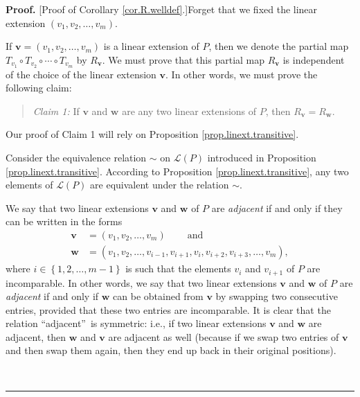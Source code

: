 \documentclass[numbers=enddot,12pt,final,onecolumn,notitlepage]{scrartcl}%
\theoremstyle{definition}
\newenvironment{verlong}{}{}
\newenvironment{statement}{\begin{quote}}{\end{quote}}
\newenvironment{proof}[1][Proof]{\noindent\textbf{#1.} }{\ \rule{0.5em}{0.5em}}
\begin{document}
\begin{verlong}


\begin{proof}
[Proof of Corollary \ref{cor.R.welldef}.]Forget that we fixed the linear
extension $\left(  v_{1},v_{2},\ldots,v_{m}\right)  $.

If $\mathbf{v}=\left(  v_{1},v_{2},\ldots,v_{m}\right)  $ is a linear
extension of $P$, then we denote the partial map $T_{v_{1}}\circ T_{v_{2}%
}\circ\cdots\circ T_{v_{m}}$ by $R_{\mathbf{v}}$. We must prove that this
partial map $R_{\mathbf{v}}$ is independent of the choice of the linear
extension $\mathbf{v}$. In other words, we must prove the following claim:

\begin{statement}
\textit{Claim 1:} If $\mathbf{v}$ and $\mathbf{w}$ are any two linear
extensions of $P$, then $R_{\mathbf{v}}=R_{\mathbf{w}}$.
\end{statement}

Our proof of Claim 1 will rely on Proposition \ref{prop.linext.transitive}.

Consider the equivalence relation $\sim$ on $\mathcal{L}\left(  P\right)  $
introduced in Proposition \ref{prop.linext.transitive}. According to
Proposition \ref{prop.linext.transitive}, any two elements of $\mathcal{L}%
\left(  P\right)  $ are equivalent under the relation $\sim$.

We say that two linear extensions $\mathbf{v}$ and $\mathbf{w}$ of $P$ are
\emph{adjacent} if and only if they can be written in the forms%
\begin{align*}
\mathbf{v}  &  =\left(  v_{1},v_{2},\ldots,v_{m}\right)
\ \ \ \ \ \ \ \ \ \ \text{and}\\
\mathbf{w}  &  =\left(  v_{1},v_{2},\ldots,v_{i-1},v_{i+1},v_{i}%
,v_{i+2},v_{i+3},\ldots,v_{m}\right)  ,
\end{align*}
where $i\in\left\{  1,2,\ldots,m-1\right\}  $ is such that the elements
$v_{i}$ and $v_{i+1}$ of $P$ are incomparable. In other words, we say that two
linear extensions $\mathbf{v}$ and $\mathbf{w}$ of $P$ are \emph{adjacent} if
and only if $\mathbf{w}$ can be obtained from $\mathbf{v}$ by swapping two
consecutive entries, provided that these two entries are incomparable. It is
clear that the relation \textquotedblleft adjacent\textquotedblright\ is
symmetric: i.e., if two linear extensions $\mathbf{v}$ and $\mathbf{w}$ are
adjacent, then $\mathbf{w}$ and $\mathbf{v}$ are adjacent as well (because if
we swap two entries of $\mathbf{v}$ and then swap them again, then they end up
back in their original positions).


\end{proof}
\end{verlong}
\end{document}
